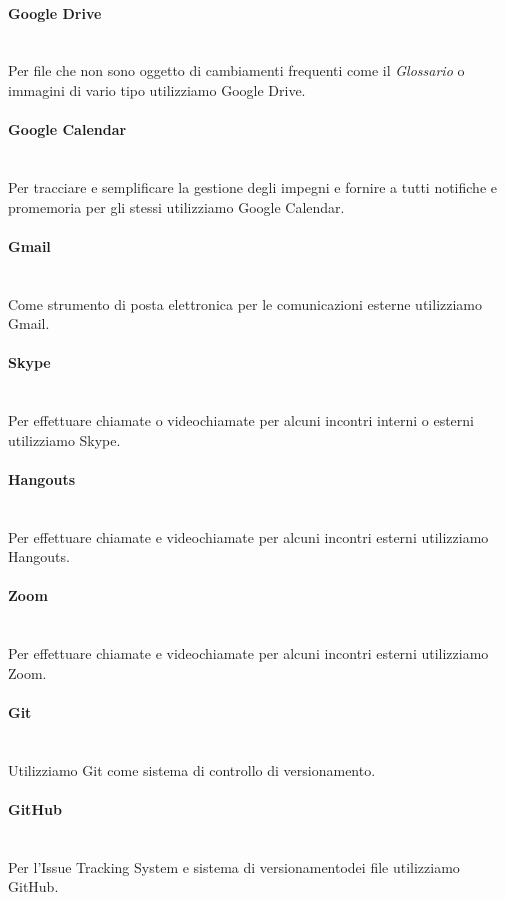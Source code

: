 			\paragraph{Google Drive} \mbox{}\\ [1mm]
				Per file che non sono oggetto di cambiamenti frequenti come il \textit{Glossario} o immagini di vario tipo utilizziamo Google Drive.
			\paragraph{Google Calendar} \mbox{}\\ [1mm]
				Per tracciare e semplificare la gestione degli impegni e fornire a tutti notifiche e promemoria per gli stessi utilizziamo Google Calendar.
			\paragraph{Gmail} \mbox{}\\ [1mm]
				Come strumento di posta elettronica per le comunicazioni esterne utilizziamo Gmail.
			\paragraph{Skype} \mbox{}\\ [1mm]
				Per effettuare chiamate o videochiamate per alcuni incontri interni o esterni utilizziamo Skype.
			\paragraph{Hangouts} \mbox{}\\ [1mm]
				Per effettuare chiamate e videochiamate per alcuni incontri esterni utilizziamo Hangouts.
			\paragraph{Zoom} \mbox{}\\ [1mm]
				Per effettuare chiamate e videochiamate per alcuni incontri esterni utilizziamo Zoom.
			\paragraph{Git} \mbox{}\\ [1mm]
				Utilizziamo Git come sistema di controllo di versionamento\glo.
			\paragraph{GitHub} \mbox{}\\ [1mm]
				Per l'Issue Tracking System e sistema di versionamento\glosp dei file utilizziamo GitHub.
